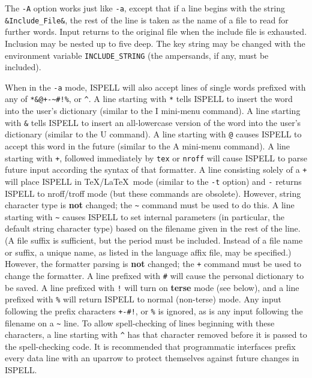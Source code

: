 \begin{itemize}
The \verb+-A+ option works just like \verb+-a+, except that if a line begins
with the string \verb+&Include_File&+, the rest of the line is taken as the
name of a file to read for further words.
Input returns to the original file when the include file is exhausted.
Inclusion may be nested up to five deep.
The key string may be changed with the environment variable
\verb+INCLUDE_STRING+ (the ampersands, if any, must be included).

When in the \verb+-a+ mode, ISPELL will also accept lines of single words
prefixed with any of \verb=*&@+-~#!%=, or \verb+^+\@.
A line starting with \verb+*+ tells ISPELL to insert the word into the user's
dictionary (similar to the I mini-menu command).
A line starting with \verb+&+ tells ISPELL to insert an all-lowercase version
of the word into the user's dictionary (similar to the U command).
A line starting with \verb+@+ causes ISPELL to accept this word in the future
(similar to the A mini-menu command).
A line starting with \verb-+-, followed immediately by \verb+tex+ or
\verb+nroff+ will cause ISPELL to parse future input according the syntax of
that formatter.
A line consisting solely of a \verb-+- will place ISPELL in \TeX /\LaTeX\ mode
(similar to the \verb+-t+ option) and \verb+-+ returns ISPELL to nroff/troff
mode (but these commands are obsolete).
However, string character type is {\bf not} changed; the \verb+~+ command
must be used to do this.
A line starting with \verb+~+ causes ISPELL to set internal parameters (in
particular, the default string character type) based on the filename given in
the rest of the line.
(A file suffix is sufficient, but the period must be included.
Instead of a file name or suffix, a unique name, as listed in the language
affix file, may be specified.)
However, the formatter parsing is {\bf not} changed; the \verb-+- command must
be used to change the formatter.
A line prefixed with \verb+#+ will cause the personal dictionary to be saved.
A line prefixed with \verb+!+ will turn on {\bf terse} mode (see below), and
a line prefixed with \verb+%+ will return ISPELL to normal (non-terse) mode.
Any input following the prefix characters \verb=+-#!=, or \verb+%+ is ignored,
as is any input following the filename on a \verb+~+ line.
To allow spell-checking of lines beginning with these characters, a line
starting with \verb+^+ has that character removed before it is passed to the
spell-checking code.
It is recommended that programmatic interfaces prefix every data line with an
uparrow to protect themselves against future changes in ISPELL\@.


\end{itemize}
